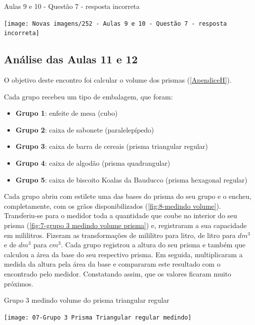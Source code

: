 \begin{CenteredFigure}
    \caption{Aulas 9 e 10 - Questão 7 - resposta incorreta} \label{fig: 252 - Aulas 9 e 10 - Questao 7 - resposta incorreta}
    \texttt{[image: Novas imagens/252 - Aulas 9 e 10 - Questão 7 - resposta incorreta]}
    \legend{\autoria}
\end{CenteredFigure}

\subsection{Análise das Aulas 11 e 12}

O objetivo deste encontro foi calcular o volume dos prismas (\autoref{ApendiceH}).

Cada grupo recebeu um tipo de embalagem, que foram:

\begin{itemize}
    \item \textbf{Grupo 1}: enfeite de mesa (cubo)
    \item \textbf{Grupo 2}: caixa de sabonete (paralelepípedo)
    \item \textbf{Grupo 3}: caixa de barra de cereais (prisma triangular regular)
    \item \textbf{Grupo 4}: caixa de algodão (prisma quadrangular)
    \item \textbf{Grupo 5}: caixa de biscoito Koalas da Bauducco (prisma hexagonal regular)
\end{itemize}

Cada grupo abriu com estilete uma das bases do prisma do seu grupo e o encheu, completamente, com os grãos disponibilizados (\autoref{fig:8-medindo volume}). Transferiu-se para o medidor toda a quantidade que coube no interior do seu prisma (\autoref{fig:7-grupo 3 medindo volume prisma}) e, registraram a sua capacidade em mililitros. Fizeram as transformações de mililitro para litro, de litro para $dm^3$ e de $dm^3$ para $cm^3$. Cada grupo registrou a altura do seu prisma e também que calculou a área da base do seu respectivo prisma. Em seguida, multiplicaram a medida da altura pela área da base e compararam este resultado com o encontrado pelo medidor. Constatando assim, que os valores ficaram muito próximos.

\begin{CenteredFigure}
    \caption{Grupo 3 medindo volume do prisma triangular regular} \label{fig:7-grupo 3 medindo volume prisma}
    \texttt{[image: 07-Grupo 3 Prisma Triangular regular medindo]}
    \legend{\autoria}
\end{CenteredFigure}

